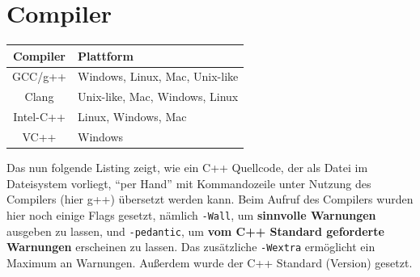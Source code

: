 \documentclass[a4paper]{report}
\begin{document}
\begin{center}
{
}
\end{center}


\section{Compiler}
\begin{center}
\begin{tabular}{|c|l|}
	\hline
	\textbf{Compiler} & \textbf{Plattform} \\ \hline \hline
	GCC/g++ & Windows, Linux, Mac, Unix-like \\ \hline
	Clang & Unix-like, Mac, Windows, Linux \\ \hline
	Intel-C++ & Linux, Windows, Mac \\ \hline
	VC++ & Windows \\ \hline
\end{tabular}
\end{center}
Das nun folgende Listing zeigt, wie ein C++ Quellcode, der als Datei im Dateisystem vorliegt, "`per Hand"' mit Kommandozeile unter Nutzung des Compilers (hier g++) übersetzt werden kann. Beim Aufruf des Compilers wurden hier noch einige Flags gesetzt, nämlich \texttt{-Wall}, um \textbf{sinnvolle Warnungen} ausgeben zu lassen, und \texttt{-pedantic}, um \textbf{vom C++ Standard geforderte Warnungen} erscheinen zu lassen. Das zusätzliche \texttt{-Wextra} ermöglicht ein Maximum an Warnungen. Außerdem wurde der C++ Standard (Version) gesetzt.
\end{document}

